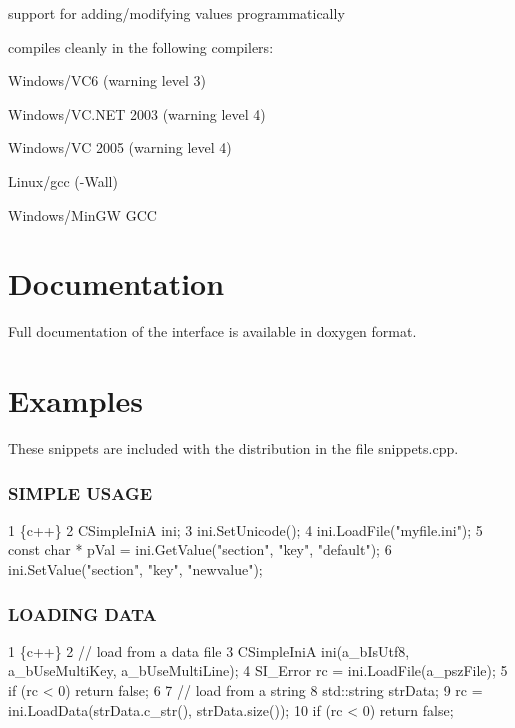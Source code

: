 \begin{DoxyItemize}
\item support for adding/modifying values programmatically
\item compiles cleanly in the following compilers\+:
\begin{DoxyItemize}
\item Windows/\+V\+C6 (warning level 3)
\item Windows/\+V\+C.\+N\+ET 2003 (warning level 4)
\item Windows/\+VC 2005 (warning level 4)
\item Linux/gcc (-\/\+Wall)
\item Windows/\+Min\+GW G\+CC
\end{DoxyItemize}
\end{DoxyItemize}

\section*{Documentation}

Full documentation of the interface is available in doxygen format.

\section*{Examples}

These snippets are included with the distribution in the file snippets.\+cpp.

\subsubsection*{S\+I\+M\+P\+LE U\+S\+A\+GE}


\begin{DoxyCode}
1 \{c++\}
2 CSimpleIniA ini;
3 ini.SetUnicode();
4 ini.LoadFile("myfile.ini");
5 const char * pVal = ini.GetValue("section", "key", "default");
6 ini.SetValue("section", "key", "newvalue");
\end{DoxyCode}


\subsubsection*{L\+O\+A\+D\+I\+NG D\+A\+TA}


\begin{DoxyCode}
1 \{c++\}
2 // load from a data file
3 CSimpleIniA ini(a\_bIsUtf8, a\_bUseMultiKey, a\_bUseMultiLine);
4 SI\_Error rc = ini.LoadFile(a\_pszFile);
5 if (rc < 0) return false;
6 
7 // load from a string
8 std::string strData;
9 rc = ini.LoadData(strData.c\_str(), strData.size());
10 if (rc < 0) return false;
\end{DoxyCode}


